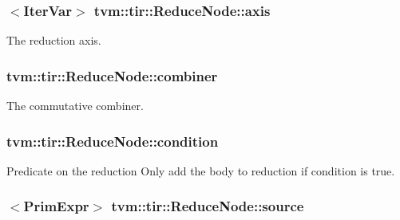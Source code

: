 \subsubsection[{\texorpdfstring{axis}{axis}}]{$<${\bf Iter\+Var}$>$ tvm\+::tir\+::\+Reduce\+Node\+::axis}\hypertarget{classtvm_1_1tir_1_1ReduceNode_a570320077ad05834027c4eae1c228e00}{}\label{classtvm_1_1tir_1_1ReduceNode_a570320077ad05834027c4eae1c228e00}


The reduction axis. 

\subsubsection[{\texorpdfstring{combiner}{combiner}}]{ tvm\+::tir\+::\+Reduce\+Node\+::combiner}\hypertarget{classtvm_1_1tir_1_1ReduceNode_a5dcdd28aac37f4313ad18065bf824e11}{}\label{classtvm_1_1tir_1_1ReduceNode_a5dcdd28aac37f4313ad18065bf824e11}


The commutative combiner. 

\subsubsection[{\texorpdfstring{condition}{condition}}]{ tvm\+::tir\+::\+Reduce\+Node\+::condition}\hypertarget{classtvm_1_1tir_1_1ReduceNode_acd7c0d18b8b1cc78203479dfd52cd94c}{}\label{classtvm_1_1tir_1_1ReduceNode_acd7c0d18b8b1cc78203479dfd52cd94c}


Predicate on the reduction Only add the body to reduction if condition is true. 

\subsubsection[{\texorpdfstring{source}{source}}]{$<${\bf Prim\+Expr}$>$ tvm\+::tir\+::\+Reduce\+Node\+::source}\hypertarget{classtvm_1_1tir_1_1ReduceNode_ab1b5e256aabba3307ccfeb291bb58771}{}\label{classtvm_1_1tir_1_1ReduceNode_ab1b5e256aabba3307ccfeb291bb58771}


